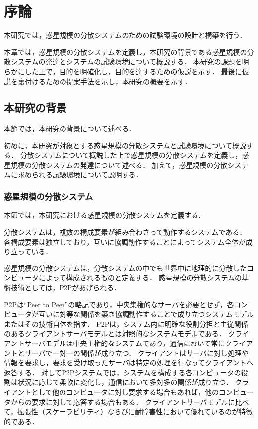 \chapter{序論}
\label{introduction}

本研究では，惑星規模の分散システムのための試験環境の設計と構築を行う．

本章では，惑星規模の分散システムを定義し，本研究の背景である惑星規模の分散システムの発達とシステムの試験環境について概説する．
本研究の課題を明らかにした上で，目的を明確化し，目的を達するための仮説を示す．
最後に仮説を裏付けるための提案手法を示し，本研究の概要を示す．

\section{本研究の背景}
\label{introduction:background}

本節では，本研究の背景について述べる．

初めに，本研究が対象とする惑星規模の分散システムと試験環境について概説する．
分散システムについて概説した上で惑星規模の分散システムを定義し，惑星規模の分散システムの発達について述べる．
加えて，惑星規模の分散システムに求められる試験環境について説明する．

\subsection{惑星規模の分散システム}

本節では，本研究における惑星規模の分散システムを定義する．

分散システムは，複数の構成要素が組み合わさって動作するシステムである．
各構成要素は独立しており，互いに協調動作することによってシステム全体が成り立っている．

惑星規模の分散システムは，分散システムの中でも世界中に地理的に分散したコンピュータによって構成されるものと定義する．
惑星規模の分散システムの基盤技術としては，P2Pがあげられる．

P2Pは``Peer to Peer''の略記であり，中央集権的なサーバを必要とせず，各コンピュータが互いに対等な関係を築き協調動作することで成り立つシステムモデルまたはその技術自体を指す．
P2Pは，システム内に明確な役割分担と主従関係のあるクライアントサーバモデルとは対照的なシステムモデルである．
クライアントサーバモデルは中央主権的なシステムであり，通信において常にクライアントとサーバで一対一の関係が成り立つ．
クライアントはサーバに対し処理や情報を要求し，要求を受け取ったサーバは特定の処理を行なってクライアントへ返答する．
対してP2Pシステムでは，システムを構成する各コンピュータの役割は状況に応じて柔軟に変化し，通信において多対多の関係が成り立つ．
クライアントとして他のコンピュータに対し要求する場合もあれば，他のコンピュータからの要求に対して応答する場合もある．
クライアントサーバモデルに比べて，拡張性（スケーラビリティ）ならびに耐障害性において優れているのが特徴的である．

